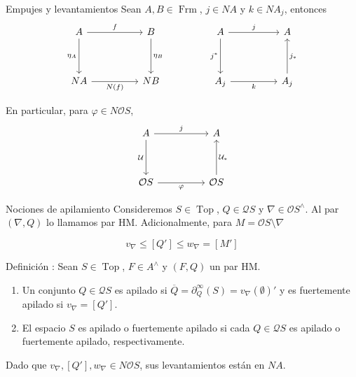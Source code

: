 \documentclass[compress,12pt]{beamer}
\DeclareMathOperator{\Frm}{Frm}
\DeclareMathOperator{\Top}{Top}
\begin{document}
\begin{frame}[fragile]{Empujes y levantamientos}
  Sean $A, B\in \Frm$, $j\in NA$ y $k\in NA_j$, entonces 
\[\begin{tikzcd}
	A && B && A && A \\
	\\
	NA && NB && {A_j} && {A_j}
	\arrow["f", from=1-1, to=1-3]
	\arrow["{\eta_A}"', from=1-1, to=3-1]
	\arrow["{\eta_B}", from=1-3, to=3-3]
	\arrow["j", from=1-5, to=1-7]
	\arrow["{j^*}"', from=1-5, to=3-5]
	\arrow["{N(f)}"', from=3-1, to=3-3]
	\arrow["k"', from=3-5, to=3-7]
	\arrow["{j_*}"', from=3-7, to=1-7]
\end{tikzcd}\]

En particular, para $\varphi \in N\mathcal{O}S$,
  \[\begin{tikzcd}
	A && A \\
	\\
	{\mathcal{O}S} && {\mathcal{O}S}
	\arrow["j", from=1-1, to=1-3]
	\arrow["{\mathcal{U}}"', from=1-1, to=3-1]
	\arrow["\varphi"', from=3-1, to=3-3]
	\arrow["{\mathcal{U}_*}"', from=3-3, to=1-3]
\end{tikzcd}\]
\end{frame}

\begin{frame}{Nociones de apilamiento}
Consideremos $S\in\Top$, $Q\in \mathcal{Q}S$ y $\nabla\in \mathcal{O}S^\wedge$. Al par $(\nabla, Q)$ lo llamamos par HM.
Adicionalmente, para $M=\mathcal{O}S\setminus \nabla$

\begin{equation}\label{Intervalo}
v_\nabla\leq [Q']\leq w_\nabla=[M']
\end{equation}

\begin{block}{Definición \citep{sexton2006ordinal}:}
  Sean $S\in \Top$, $F\in A^\wedge$ y $(F, Q)$ un par HM.
\begin{enumerate}
  \item Un conjunto $Q\in \mathcal{Q}S$ es apilado si $\overline{Q}=\partial_Q^\infty(S)=v_\nabla(\emptyset)'$ y es fuertemente apilado si $v_\nabla=[Q']$.
  \item El espacio $S$ es apilado o fuertemente apilado si cada $Q\in \mathcal{Q}S$ es apilado o fuertemente apilado, respectivamente.
\end{enumerate}
\end{block}

Dado que $v_\nabla, [Q'], w_\nabla\in N\mathcal{O}S$, sus levantamientos están en $NA$.
\end{frame}
\end{document}
